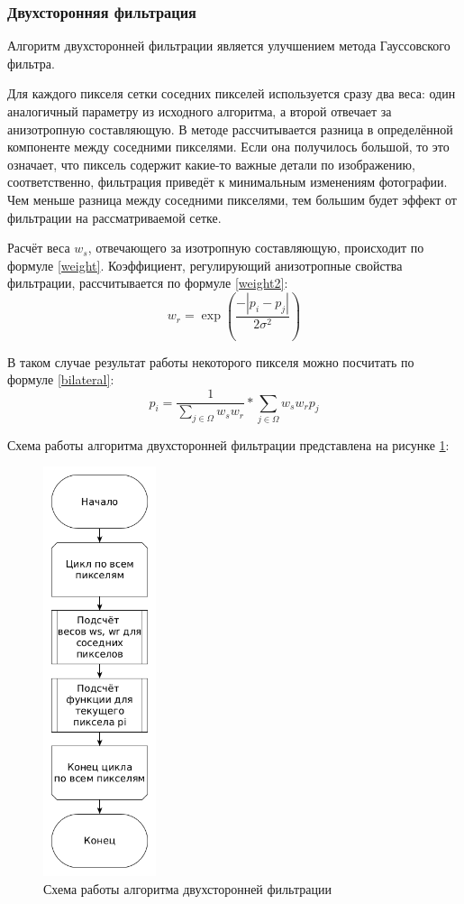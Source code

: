 \subsubsection{Двухсторонняя фильтрация}
Алгоритм двухсторонней фильтрации является улучшением метода Гауссовского фильтра.

Для каждого пикселя сетки соседних пикселей используется сразу два веса: один аналогичный параметру из исходного алгоритма, а второй отвечает за анизотропную составляющую. 
В методе рассчитывается разница в определённой компоненте между соседними пикселями.
Если она получилось большой, то это означает, что пиксель содержит какие-то важные детали по изображению, соответственно, фильтрация приведёт к минимальным изменениям фотографии.
Чем меньше разница между соседними пикселями, тем большим будет эффект от фильтрации на рассматриваемой сетке.

Расчёт веса $w_s$, отвечающего за изотропную составляющую, происходит по формуле \ref{weight}. 
Коэффициент, регулирующий анизотропные свойства фильтрации, рассчитывается по формуле \ref{weight2}:
\begin{equation}
	\label{weight2}
	w_{r} = \exp(\frac{-|p_i - p_j|}{2\sigma^2})
\end{equation}

В таком случае результат работы некоторого пикселя можно посчитать по формуле \ref{bilateral}:
\begin{equation}
	\label{bilateral}
	p_i = \frac{1}{\sum_{j \in \Omega}^{} w_{s}w_{r}} * \sum_{j \in \Omega}^{} w_{s}w_{r}p_j 
\end{equation}

Схема работы алгоритма двухсторонней фильтрации представлена на рисунке \ref{fig::bilateral}:
\FloatBarrier
\begin{figure}[h]	
	\begin{center}
		\includegraphics[height=12cm]{inc/png/bilateral.png}
	\end{center}
	\captionsetup{justification=centering}
	\caption{Схема работы алгоритма двухсторонней фильтрации}
	\label{fig::bilateral}
\end{figure}
\FloatBarrier

